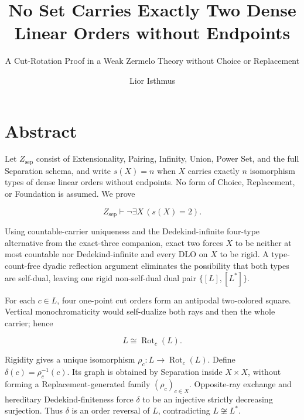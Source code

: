 \documentclass[
  english,
  11pt,
  reqno]{amsart}
\title{No Set Carries Exactly Two Dense Linear Orders without Endpoints}
\subtitle{A Cut-Rotation Proof in a Weak Zermelo Theory without Choice
or Replacement}
\author{Lior Isthmus}
\date{}
\begin{document}
\maketitle


\protect{}\label{sec:title}

\protect{}\label{sec:abstract}

\section*{Abstract}\label{abstract}

Let \(Z_{\mathrm{sep}}\) consist of Extensionality, Pairing, Infinity,
Union, Power Set, and the full Separation schema, and write \(s(X)=n\)
when \(X\) carries exactly \(n\) isomorphism types of dense linear
orders without endpoints. No form of Choice, Replacement, or Foundation
is assumed. We prove

\hypertarget{eq:abstract-main}{}

\begin{equation*}
Z_{\mathrm{sep}}
\vdash
\neg\exists X\,(s(X)=2).
\end{equation*}

Using countable-carrier uniqueness and the Dedekind-infinite four-type
alternative from the exact-three companion, exact two forces \(X\) to be
neither at most countable nor Dedekind-infinite and every DLO on \(X\)
to be rigid. A type-count-free dyadic reflection argument eliminates the
possibility that both types are self-dual, leaving one rigid
non-self-dual dual pair \(\{[L],[L^*]\}\).

For each \(c\in L\), four one-point cut orders form an antipodal
two-colored square. Vertical monochromaticity would self-dualize both
rays and then the whole carrier; hence

\[
L\cong\operatorname{Rot}_c(L).
\]

Rigidity gives a unique isomorphism
\(\rho_c:L\to\operatorname{Rot}_c(L)\). Define
\(\delta(c)=\rho_c^{-1}(c)\). Its graph is obtained by Separation inside
\(X\times X\), without forming a Replacement-generated family
\((\rho_c)_{c\in X}\). Opposite-ray exchange and hereditary
Dedekind-finiteness force \(\delta\) to be an injective strictly
decreasing surjection. Thus \(\delta\) is an order reversal of \(L\),
contradicting \(L\not\cong L^*\).
\end{document}
